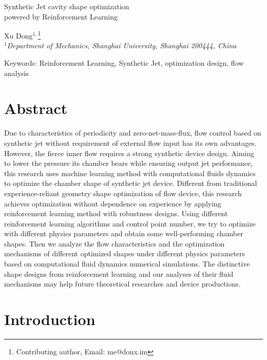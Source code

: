\documentclass{article}
\begin{document}
\begin{center}
\LARGE Synthetic Jet cavity shape optimization\\
powered by Reinforcement Learning\\
\end{center}

\begin{center}
\renewcommand{\thefootnote}{\fnsymbol{footnote}}
Xu Dong$^{1,}$\footnote{Contributing author, Email: me@donx.im}\\
$^{1}$\textit{Department of Mechanics, Shanghai University, Shanghai 200444, China}
\end{center}

\begin{center}
Keywords: Reinforcement Learning, Synthetic Jet, optimization design, flow analysis
\end{center}

\section*{Abstract}
\indent

Due to characteristics of periodicity and zero-net-mass-flux, flow control based on synthetic jet without requirement of external flow input has its own advantages.
However, the fierce inner flow requires a strong synthetic device design.
Aiming to lower the pressure its chamber bears while ensuring output jet performance, this research uses machine learning method with computational fluids dynamics to optimize the chamber shape of synthetic jet device.
Different from traditional experience-reliant geometry shape optimization of flow device, this research achieves optimization without dependence on experience by applying reinforcement learning method with robustness designs.
Using different reinforcement learning algorithms and control point number, we try to optimize with different physics parameters and obtain some well-performing chamber shapes.
Then we analyze the flow characteristics and the optimization mechanisms of different optimized shapes under different physics parameters based on computational fluid dynamics numerical simulations.
The distinctive shape designs from reinforcement learning and our analyses of their fluid mechanisms may help future theoretical researches and device productions.

\section*{Introduction}
\addtocounter{section}{1}
\setcounter{subsection}{0}
\indent
\end{document}
